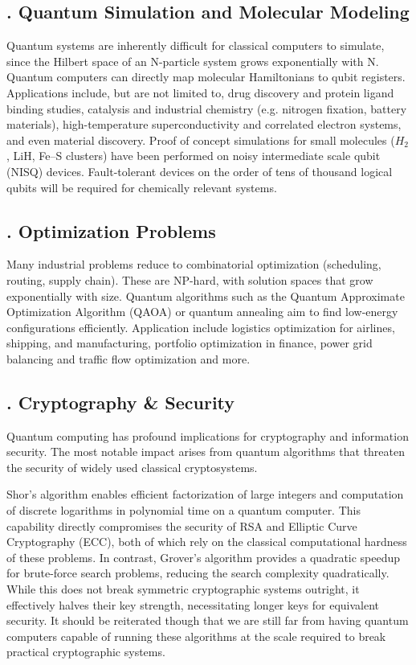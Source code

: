 \documentclass{elbioimp2}
\begin{document}
\subsection{. Quantum Simulation and Molecular Modeling}
Quantum systems are inherently difficult for classical computers to simulate, since the Hilbert space of an N-particle system grows exponentially with N. Quantum computers can directly map molecular Hamiltonians to qubit registers. Applications include, but are not limited to, drug discovery and protein ligand binding studies, catalysis and industrial chemistry (e.g. nitrogen fixation, battery materials), high-temperature superconductivity and correlated electron systems, and even material discovery. Proof of concept simulations for small molecules ($H_2$, LiH, Fe–S clusters) have been performed on noisy intermediate scale qubit (NISQ) devices. Fault-tolerant devices on the order of tens of thousand logical qubits will be required for chemically relevant systems.

\subsection{. Optimization Problems}
Many industrial problems reduce to combinatorial optimization (scheduling, routing, supply chain). These are NP-hard, with solution spaces that grow exponentially with size. Quantum algorithms such as the Quantum Approximate Optimization Algorithm (QAOA) or quantum annealing aim to find low-energy configurations efficiently. Application include logistics optimization for airlines, shipping, and manufacturing, portfolio optimization in finance, power grid balancing and traffic flow optimization and more.

\subsection{. Cryptography \& Security}
Quantum computing has profound implications for cryptography and information security. The most notable impact arises from quantum algorithms that threaten the security of widely used classical cryptosystems.

Shor’s algorithm enables efficient factorization of large integers and computation of discrete logarithms in polynomial time on a quantum computer. This capability directly compromises the security of RSA and Elliptic Curve Cryptography (ECC), both of which rely on the classical computational hardness of these problems. In contrast, Grover’s algorithm provides a quadratic speedup for brute-force search problems, reducing the search complexity quadratically. While this does not break symmetric cryptographic systems outright, it effectively halves their key strength, necessitating longer keys for equivalent security. It should be reiterated though that we are still far from having quantum computers capable of running these algorithms at the scale required to break practical cryptographic systems.
\end{document}
